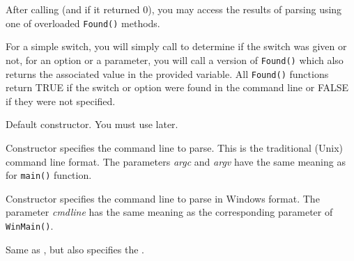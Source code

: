 \label{wxcmdlineparsergettingresults}

After calling  (and if it returned $0$),
you may access the results of parsing using one of overloaded {\tt Found()}
methods.

For a simple switch, you will simply call 
 to determine if the switch was given
or not, for an option or a parameter, you will call a version of {\tt Found()} 
which also returns the associated value in the provided variable. All 
{\tt Found()} functions return TRUE if the switch or option were found in the
command line or FALSE if they were not specified.


\label{wxcmdlineparserwxcmdlineparserdef}


Default constructor. You must use 
 later.

\label{wxcmdlineparserwxcmdlineparserargc}


Constructor specifies the command line to parse. This is the traditional
(Unix) command line format. The parameters {\it argc} and {\it argv} have the
same meaning as for {\tt main()} function.

\label{wxcmdlineparserwxcmdlineparserstr}


Constructor specifies the command line to parse in Windows format. The parameter 
{\it cmdline} has the same meaning as the corresponding parameter of 
{\tt WinMain()}.

\label{wxcmdlineparserwxcmdlineparserdesc}


Same as , but also
specifies the .

